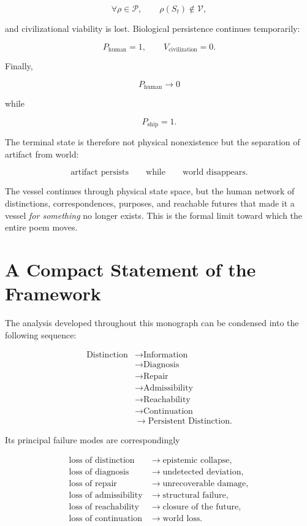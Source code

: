 \documentclass[11pt,oneside]{book}
\theoremstyle{definition}
\theoremstyle{remark}
\begin{document}
\[
\forall\rho\in\mathcal{P}, \qquad \rho(S_t)\notin\mathcal{V},
\]

and civilizational viability is lost. Biological persistence continues temporarily:

\[
P_{\mathrm{human}}=1, \qquad V_{\mathrm{civilization}}=0.
\]

Finally,

\[
P_{\mathrm{human}}\rightarrow0
\]

while

\[
P_{\mathrm{ship}}=1.
\]

The terminal state is therefore not physical nonexistence but the separation of artifact from world:

\[
\text{artifact persists} \qquad \text{while} \qquad \text{world disappears}.
\]

The vessel continues through physical state space, but the human network of distinctions,
correspondences, purposes, and reachable futures that made it a vessel \emph{for something} no
longer exists. This is the formal limit toward which the entire poem moves.

\section{A Compact Statement of the Framework}

The analysis developed throughout this monograph can be condensed into the following sequence:

\[
\boxed{ \begin{aligned} \text{Distinction} &\rightarrow \text{Information} \\ &\rightarrow \text{Diagnosis} \\ &\rightarrow \text{Repair} \\ &\rightarrow \text{Admissibility} \\ &\rightarrow \text{Reachability} \\ &\rightarrow \text{Continuation} \\ &\rightarrow \text{Persistent Distinction}. \end{aligned} }
\]

Its principal failure modes are correspondingly

\[
\boxed{ \begin{aligned} \text{loss of distinction} &\rightarrow \text{epistemic collapse}, \\ \text{loss of diagnosis} &\rightarrow \text{undetected deviation}, \\ \text{loss of repair} &\rightarrow \text{unrecoverable damage}, \\ \text{loss of admissibility} &\rightarrow \text{structural failure}, \\ \text{loss of reachability} &\rightarrow \text{closure of the future}, \\ \text{loss of continuation} &\rightarrow \text{world loss}. \end{aligned} }
\]
\end{document}
